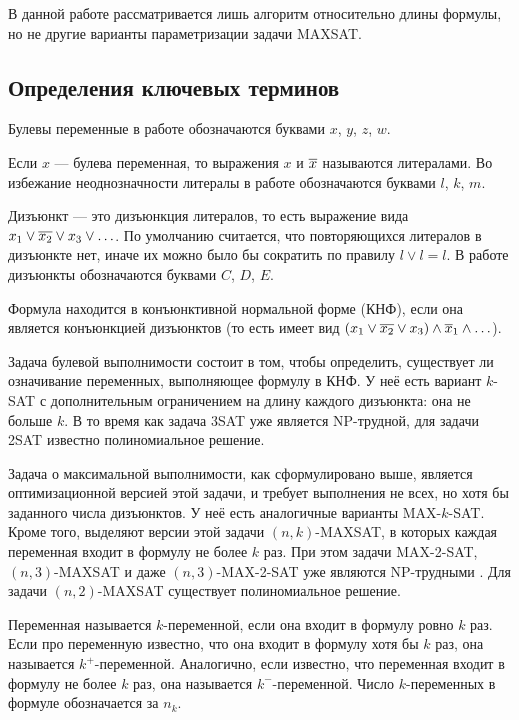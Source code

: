 В данной работе рассматривается лишь алгоритм относительно длины формулы, но не другие варианты параметризации задачи MAXSAT.

\subsection*{Определения ключевых терминов}

\firstpar{}Булевы переменные в работе обозначаются буквами $x$, $y$, $z$, $w$.

Если $x$ — булева переменная, то выражения $x$ и $\overline{x}$ называются литералами. Во избежание неоднозначности литералы в работе обозначаются буквами $l$, $k$, $m$.

Дизъюнкт — это дизъюнкция литералов, то есть выражение вида $x_1 \vee \overline{x_2} \vee x_3 \vee \ldots$. По умолчанию считается, что повторяющихся литералов в дизъюнкте нет, иначе их можно было бы сократить по правилу $l \vee l = l$. В работе дизъюнкты обозначаются буквами $C$, $D$, $E$.

Формула находится в конъюнктивной нормальной форме (КНФ), если она является конъюнкцией дизъюнктов (то есть имеет вид $(x_1 \vee \overline{x_2} \vee x_3) \wedge \overline{x}_1 \wedge \ldots$).

Задача булевой выполнимости состоит в том, чтобы определить, существует ли означивание переменных, выполняющее формулу в КНФ. У неё есть вариант $k$-SAT с дополнительным ограничением на длину каждого дизъюнкта: она не больше $k$. В то время как задача 3SAT уже является NP-трудной, для задачи 2SAT известно полиномиальное решение.

Задача о максимальной выполнимости, как сформулировано выше, является оптимизационной версией этой задачи, и требует выполнения не всех, но хотя бы заданного числа дизъюнктов. У неё есть аналогичные варианты MAX-$k$-SAT. Кроме того, выделяют версии этой задачи $(n,k)$-MAXSAT, в которых каждая переменная входит в формулу не более $k$ раз. При этом задачи MAX-2-SAT, $(n,3)$-MAXSAT и даже $(n,3)$-MAX-2-SAT уже являются NP-трудными \cite{raman1998simplified}. Для задачи $(n,2)$-MAXSAT существует полиномиальное решение.

Переменная называется $k$-переменной, если она входит в формулу ровно $k$ раз.
Если про переменную известно, что она входит в формулу хотя бы $k$ раз, она называется $k^+$-переменной. Аналогично, если известно, что переменная входит в формулу не более $k$ раз, она называется $k^-$-переменной. Число $k$-переменных в формуле обозначается за $n_k$.


